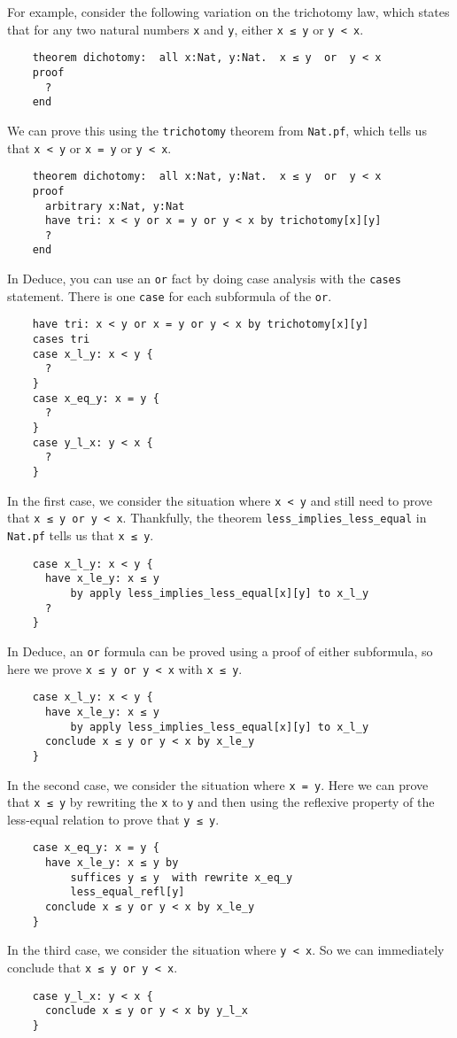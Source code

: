 \documentclass[12pt]{article}
\begin{document}
For example, consider the following variation on the trichotomy law,
which states that for any two natural numbers \texttt{x} and
\texttt{y}, either \texttt{x ≤ y} or \texttt{y < x}.

\begin{verbatim}
    theorem dichotomy:  all x:Nat, y:Nat.  x ≤ y  or  y < x
    proof
      ?
    end
\end{verbatim}
We can prove this using the \texttt{trichotomy} theorem from
\texttt{Nat.pf}, which tells us that \texttt{x < y} or \texttt{x = y}
or \texttt{y < x}.
\begin{verbatim}
    theorem dichotomy:  all x:Nat, y:Nat.  x ≤ y  or  y < x
    proof
      arbitrary x:Nat, y:Nat
      have tri: x < y or x = y or y < x by trichotomy[x][y]
      ?
    end
\end{verbatim}
In Deduce, you can use an \texttt{or} fact by doing case analysis with
the \texttt{cases} statement. There is one \texttt{case} for each
subformula of the \texttt{or}.
\begin{verbatim}
    have tri: x < y or x = y or y < x by trichotomy[x][y]
    cases tri
    case x_l_y: x < y {
      ?
    }
    case x_eq_y: x = y {
      ?
    }
    case y_l_x: y < x {
      ?
    }
\end{verbatim}
In the first case, we consider the situation where \texttt{x < y} and
still need to prove that \texttt{x ≤ y or y < x}. Thankfully, the
theorem \texttt{less\_implies\_less\_equal} in \texttt{Nat.pf} tells us
that \texttt{x ≤ y}.
\begin{verbatim}
    case x_l_y: x < y {
      have x_le_y: x ≤ y
          by apply less_implies_less_equal[x][y] to x_l_y
      ?
    }
\end{verbatim}

In Deduce, an \texttt{or} formula can be proved using a proof of either
subformula, so here we prove \texttt{x ≤ y or y < x} with \texttt{x ≤ y}.
\begin{verbatim}
    case x_l_y: x < y {
      have x_le_y: x ≤ y
          by apply less_implies_less_equal[x][y] to x_l_y
      conclude x ≤ y or y < x by x_le_y
    }
\end{verbatim}
In the second case, we consider the situation where \texttt{x =
  y}. Here we can prove that \texttt{x ≤ y} by rewriting the
\texttt{x} to \texttt{y} and then using the reflexive property of the
less-equal relation to prove that \texttt{y ≤ y}.
\begin{verbatim}
    case x_eq_y: x = y {
      have x_le_y: x ≤ y by
          suffices y ≤ y  with rewrite x_eq_y
          less_equal_refl[y]
      conclude x ≤ y or y < x by x_le_y
    }
\end{verbatim}
In the third case, we consider the situation where \texttt{y < x}.
So we can immediately conclude that \texttt{x ≤ y or y < x}.
\begin{verbatim}
    case y_l_x: y < x {
      conclude x ≤ y or y < x by y_l_x
    }
\end{verbatim}
\end{document}
